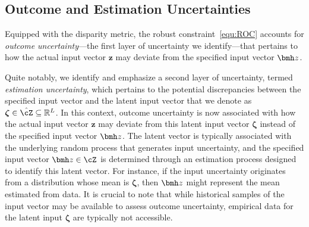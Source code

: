 \documentclass[mnsc, nonblindrev]{informswp}
\newcommand{\1}[1]{\mathds{1}{\left(#1\right)}}
\begin{document}

\subsection*{Outcome and Estimation Uncertainties}

Equipped with the disparity metric, the robust constraint~\eqref{equ:ROC} accounts for \textit{outcome uncertainty}---the first layer of uncertainty we identify---that pertains to how the actual input vector $\bm z$ may deviate from the specified input vector $\bmh z$.

Quite notably, we identify and emphasize a second layer of uncertainty, termed \textit{estimation uncertainty}, which pertains to the potential discrepancies between the specified input vector and the latent input vector that we denote as $\bm{\zeta} \in \hat{\cZ} \subseteq \mathbb{R}^L$. In this context, outcome uncertainty is now associated with how the actual input vector $\bm z$ may deviate from this latent input vector $\bm{\zeta}$ instead of the specified input vector $\bmh z$. The latent vector is typically associated with the underlying random process that generates input uncertainty, and the specified input vector $\bmh z \in \cZ$ is determined through an estimation process designed to identify this latent vector. For instance, if the input uncertainty originates from a distribution whose mean is $\bm \zeta$, then $\bmh z$ might represent the mean estimated from data. It is crucial to note that while historical samples of the input vector may be available to assess outcome uncertainty, empirical data for the latent input $\bm \zeta$ are typically not accessible.
\end{document}
